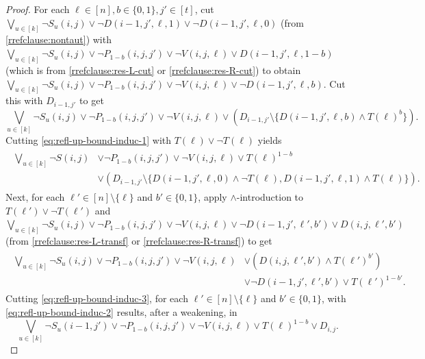 \documentclass[10pt,a4paper]{article}
\theoremstyle{remark}
\newtheorem*{switching lemma}{Switching Lemma}
\newtheorem*{open problem}{Open Problem}
\theoremstyle{definition}
\begin{document}
\begin{proof}
For each $\ell \in [n], b \in \{0,1\}, j' \in [t]$, cut $\bigvee_{u \in [k]} \neg S_u(i,j) \lor \neg D(i-1,j',\ell,1) \lor \neg D(i-1,j',\ell,0)$ (from \eqref{rrefclause:nontaut}) with $\bigvee_{u \in [k]} \neg S_u(i,j) \lor \neg P_{1-b}(i,j,j') \lor \neg V(i,j,\ell) \lor D(i-1,j',\ell,1-b)$ (which is from \eqref{rrefclause:res-L-cut} or \eqref{rrefclause:res-R-cut}) to obtain $\bigvee_{u \in [k]} \neg S_u(i,j) \lor \neg P_{1-b}(i,j,j') \lor \neg V(i,j,\ell) \lor \neg D(i-1,j',\ell,b)$. Cut this with $D_{i-1,j'}$ to get
\begin{equation}
\label{eq:refl-up-bound-induc-1}
\bigvee_{u \in [k]} \neg S_u(i,j) \lor \neg P_{1-b}(i,j,j') \lor \neg V(i,j,\ell) \lor \left(D_{i-1,j'} \setminus \{ D(i-1,j',\ell,b) \land T(\ell)^b \}\right).
\end{equation}
Cutting \eqref{eq:refl-up-bound-induc-1} with $T(\ell) \lor \neg T(\ell)$ yields
\begin{align}
 \begin{split}
\label{eq:refl-up-bound-induc-2}
\bigvee_{u \in [k]} \neg S(i,j) & \lor \neg P_{1-b}(i,j,j') \lor \neg V(i,j,\ell) \lor T(\ell)^{1-b} \\
& \lor \left( D_{i-1,j'} \setminus \{ D(i-1,j',\ell,0) \land \neg T(\ell), D(i-1,j',\ell,1) \land T(\ell) \} \right).
 \end{split}
\end{align}
Next, for each $\ell' \in [n] \setminus \{\ell\}$ and $b' \in \{0,1\}$, apply $\land$-introduction to  $T(\ell') \lor \neg T(\ell')$ and $\bigvee_{u \in [k]} \neg S_u(i,j) \lor \neg P_{1-b}(i,j,j') \lor \neg V(i,j,\ell) \lor \neg D(i-1,j',\ell',b') \lor D(i,j,\ell',b')$ (from \eqref{rrefclause:res-L-transf} or \eqref{rrefclause:res-R-transf}) to get
\begin{align}
 \begin{split}
\label{eq:refl-up-bound-induc-3}
 \bigvee_{u \in [k]} \neg S_u(i,j) \lor \neg P_{1-b}(i,j,j') \lor \neg V(i,j,\ell) & \lor \left( D(i,j,\ell',b') \land T(\ell')^{b'} \right) \\
 & \lor \neg D(i-1,j',\ell',b') \lor T(\ell')^{1-b'}.
 \end{split}
\end{align}
Cutting \eqref{eq:refl-up-bound-induc-3}, for each $\ell'\in [n] \setminus \{\ell\}$ and $b' \in \{0,1\}$, with \eqref{eq:refl-up-bound-induc-2} results, after a weakening, in
\begin{equation}
\label{eq:refl-up-bound-induc-4}
\bigvee_{u \in [k]} \neg S_u(i-1,j') \lor \neg P_{1-b}(i,j,j') \lor \neg V(i,j,\ell) \lor T(\ell)^{1-b} \lor D_{i,j}.

\end{equation}
\end{proof}
\end{document}
